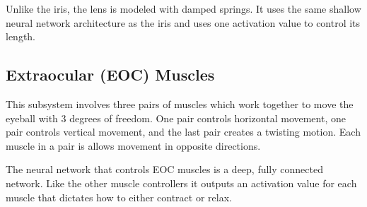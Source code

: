 \documentclass[../taasin.tex]{subfiles}
\begin{document}
Unlike the iris, the lens is modeled with damped springs. It uses the same shallow neural network architecture as the iris and uses one activation value to control its length.


\subsection{Extraocular (EOC) Muscles}

This subsystem involves three pairs of muscles which work together to move the eyeball with 3 degrees of freedom. One pair controls horizontal movement, one pair controls vertical movement, and the last pair creates a twisting motion. Each muscle in a pair is allows movement in opposite directions.  

The neural network that controls EOC muscles is a deep, fully connected network. Like the other muscle controllers it outputs an activation value for each muscle that dictates how to either contract or relax.
\end{document}
